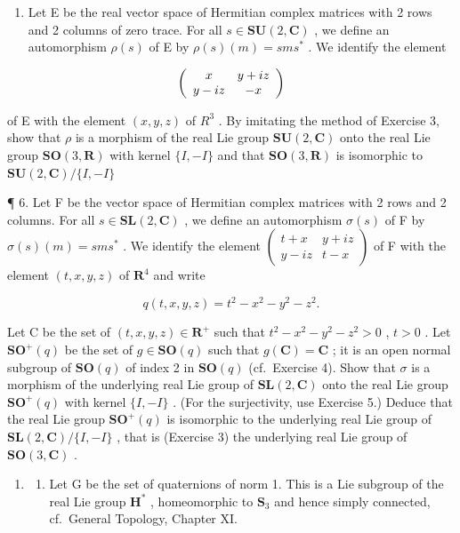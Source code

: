\begin{enumerate}
\def\labelenumi{\arabic{enumi}.}
\setcounter{enumi}{4}
\tightlist
\item
  Let E be the real vector space of Hermitian complex matrices with 2 rows and 2 columns of zero trace. For all \(s \in \mathbf{SU}(2, \mathbf{C})\) , we define an automorphism \(\rho(s)\) of E by \(\rho(s)(m) = sms^*\) . We identify the element
\end{enumerate}

\[
\left( \begin{array}{c c} x & y + i z \\ y - i z & - x \end{array} \right)
\]

of E with the element \((x,y,z)\) of \(R^{3}\) . By imitating the method of Exercise 3, show that \(\rho\) is a morphism of the real Lie group \(\mathbf{SU}(2,\mathbf{C})\) onto the real Lie group \(\mathbf{SO}(3,\mathbf{R})\) with kernel \(\{I,-I\}\) and that \(\mathbf{SO}(3,\mathbf{R})\) is isomorphic to \(\mathbf{SU}(2,\mathbf{C})/\{I,-I\}\)

¶ 6. Let F be the vector space of Hermitian complex matrices with 2 rows and 2 columns. For all \(s \in \mathbf{SL}(2, \mathbf{C})\) , we define an automorphism \(\sigma(s)\) of F by \(\sigma(s)(m) = sms^*\) . We identify the element \(\begin{pmatrix} t + x & y + iz \\ y - iz & t - x \end{pmatrix}\) of F with the element \((t, x, y, z)\) of \(\mathbf{R}^4\) and write

\[
q (t, x, y, z) = t ^ {2} - x ^ {2} - y ^ {2} - z ^ {2}.
\]

Let C be the set of \((t, x, y, z) \in \mathbf{R}^+\) such that \(t^2 - x^2 - y^2 - z^2 > 0\) , \(t > 0\) . Let \(\mathbf{SO}^+(q)\) be the set of \(g \in \mathbf{SO}(q)\) such that \(g(\mathbf{C}) = \mathbf{C}\) ; it is an open normal subgroup of \(\mathbf{SO}(q)\) of index 2 in \(\mathbf{SO}(q)\) (cf.~Exercise 4). Show that \(\sigma\) is a morphism of the underlying real Lie group of \(\mathbf{SL}(2, \mathbf{C})\) onto the real Lie group \(\mathbf{SO}^+(q)\) with kernel \(\{I, -I\}\) . (For the surjectivity, use Exercise 5.) Deduce that the real Lie group \(\mathbf{SO}^+(q)\) is isomorphic to the underlying real Lie group of \(\mathbf{SL}(2, \mathbf{C}) / \{I, -I\}\) , that is (Exercise 3) the underlying real Lie group of \(\mathbf{SO}(3, \mathbf{C})\) .

\begin{enumerate}
\def\labelenumi{\arabic{enumi}.}
\setcounter{enumi}{6}
\tightlist
\item
  \begin{enumerate}
  \def\labelenumii{(\alph{enumii})}
  \tightlist
  \item
    Let G be the set of quaternions of norm 1. This is a Lie subgroup of the real Lie group \(\mathbf{H}^*\) , homeomorphic to \(\mathbf{S}_3\) and hence simply connected, cf.~General Topology, Chapter XI.
  \end{enumerate}
\end{enumerate}

